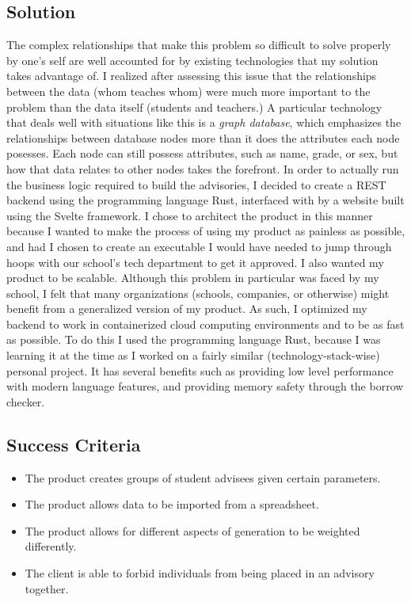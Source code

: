 \documentclass{paper}
\begin{document}
\subsection{Solution}
The complex relationships that make this problem so difficult to solve properly by one's self are well accounted for by existing technologies that my solution takes advantage of.
I realized after assessing this issue that the relationships between the data (whom teaches whom) were much more important to the problem than the data itself (students and teachers.)
A particular technology that deals well with situations like this is a \textit{graph database}, which emphasizes the relationships between database nodes more than it does the attributes each node posesses.
Each node can still possess attributes, such as name, grade, or sex, but how that data relates to other nodes takes the forefront.
In order to actually run the business logic required to build the advisories, I decided to create a REST backend using the programming language Rust, interfaced with by a website built using the Svelte framework.
I chose to architect the product in this manner because I wanted to make the process of using my product as painless as possible, and had I chosen to create an executable I would have needed to jump through hoops with our school's tech department to get it approved.
I also wanted my product to be scalable.
Although this problem in particular was faced by my school, I felt that many organizations (schools, companies, or otherwise) might benefit from a generalized version of my product.
As such, I optimized my backend to work in containerized cloud computing environments and to be as fast as possible.
To do this I used the programming language Rust, because I was learning it at the time as I worked on a fairly similar (technology-stack-wise) personal project.
It has several benefits such as providing low level performance with modern language features, and providing memory safety through the borrow checker.

\subsection{Success Criteria}
\begin{itemize}
  \item The product creates groups of student advisees given certain parameters.
  \item The product allows data to be imported from a spreadsheet.
  \item The product allows for different aspects of generation to be weighted differently.
  \item The client is able to forbid individuals from being placed in an advisory together.
\end{itemize}
\end{document}
